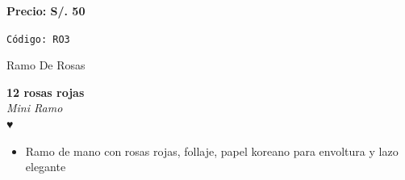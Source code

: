 \documentclass[12pt]{article}
\begin{document}
\vspace{0.3cm}
\begin{center}
   \textbf{\Large Precio: \textcolor[HTML]{228B22}{S/. 50 }}
\end{center}
\begin{center}
    \textcolor[HTML]{191970}{\texttt{Código: RO3}}
\end{center}
\vspace{1cm}
\newpage
\begin{center}\textcolor[HTML]{191970}{\huge Ramo De Rosas}\end{center}
\noindent
\begin{minipage}{0.6\textwidth}
    \textcolor[HTML]{FF8C00}{\textbf{\huge 12 rosas rojas }}\\
    {\textit{Mini Ramo}} \\
    \textcolor[HTML]{FF8C00}{\Huge ♥} \\
    \vspace{0.5cm}
    \begin{itemize}
        \item Ramo de mano con rosas rojas, follaje, papel koreano para envoltura y lazo elegante
    \end{itemize}
\end{minipage}
\hspace{1cm}
\end{document}
